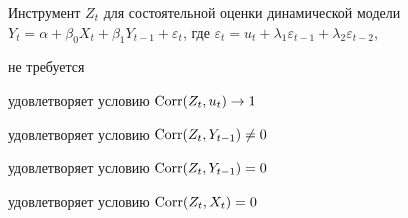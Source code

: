 
\begin{question}
Инструмент \(Z_t\) для состоятельной оценки динамической модели
\(Y_{t} =\alpha +\beta_0 X_t + \beta_1 Y_{t-1} + \varepsilon_t\), где
\(\varepsilon_t = u_t + \lambda_1 \varepsilon_{t-1} + \lambda_2 \varepsilon_{t-2}\),
\begin{answerlist}[2]
  \item не требуется
  \item удовлетворяет условию \(\operatorname{Corr}(Z_t, u_t) \to 1\)
  \item удовлетворяет условию \(\operatorname{Corr}(Z_t, Y_{t-1}) \neq 0\)
  \item удовлетворяет условию \(\operatorname{Corr}(Z_t, Y_{t-1}) =0\)
  \item удовлетворяет условию \(\operatorname{Corr}(Z_t, X_t) =0\)
\end{answerlist}
\end{question}


